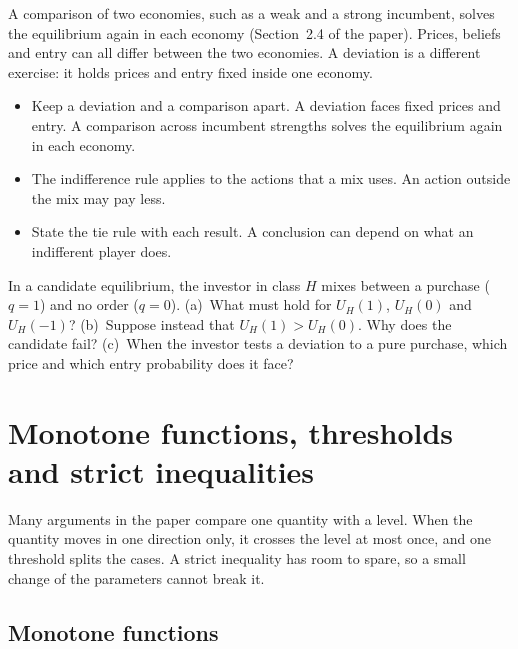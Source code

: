 A comparison of two economies, such as a weak and a strong incumbent, solves the equilibrium again in each economy
(Section~2.4 of the paper). Prices, beliefs and entry can all differ between the two economies. A deviation is a
different exercise: it holds prices and entry fixed inside one economy.

\begin{watchout}
\begin{itemize}
\item Keep a deviation and a comparison apart. A deviation faces fixed prices and entry. A comparison across
incumbent strengths solves the equilibrium again in each economy.
\item The indifference rule applies to the actions that a mix uses. An action outside the mix may pay less.
\item State the tie rule with each result. A conclusion can depend on what an indifferent player does.
\end{itemize}
\end{watchout}

\begin{checkyourself}\label{q:toolkit-games}
In a candidate equilibrium, the investor in class \(H\) mixes between a purchase (\(q=1\)) and no order
(\(q=0\)).
(a)~What must hold for \(U_H(1)\), \(U_H(0)\) and \(U_H(-1)\)?
(b)~Suppose instead that \(U_H(1)>U_H(0)\). Why does the candidate fail?
(c)~When the investor tests a deviation to a pure purchase, which price and which entry probability does it face?
\end{checkyourself}

\section{Monotone functions, thresholds and strict inequalities}\label{sec:toolkit-monotone}

\begin{intuition}
Many arguments in the paper compare one quantity with a level. When the quantity moves in one direction only, it
crosses the level at most once, and one threshold splits the cases. A strict inequality has room to spare, so a
small change of the parameters cannot break it.
\end{intuition}

\subsection{Monotone functions}


